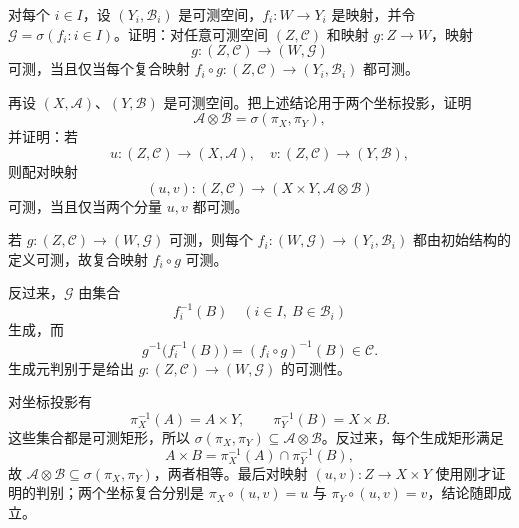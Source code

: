 \begin{exercise}
\label{b1:ex:10}
对每个 \(i\in I\)，设 \((Y_i,\mathcal B_i)\) 是可测空间，\(f_i:W\to Y_i\) 是映射，并令
\(
\mathcal G=\sigma(f_i:i\in I)
\)。证明：对任意可测空间 \((Z,\mathcal C)\) 和映射 \(g:Z\to W\)，映射
\[
g:(Z,\mathcal C)\longrightarrow(W,\mathcal G)
\]
可测，当且仅当每个复合映射 \(f_i\circ g:(Z,\mathcal C)\to(Y_i,\mathcal B_i)\) 都可测。

\ProseParagraphBreak

再设 \((X,\mathcal A)\)、\((Y,\mathcal B)\) 是可测空间。把上述结论用于两个坐标投影，证明
\[
\mathcal A\otimes\mathcal B
=\sigma(\pi_X,\pi_Y),
\]
并证明：若
\[
u:(Z,\mathcal C)\longrightarrow(X,\mathcal A),
\quad
v:(Z,\mathcal C)\longrightarrow(Y,\mathcal B),
\]
则配对映射
\[
(u,v):(Z,\mathcal C)
\longrightarrow(X\times Y,\mathcal A\otimes\mathcal B)
\]
可测，当且仅当两个分量 \(u,v\) 都可测。
\end{exercise}
\begin{solution}
若 \(g:(Z,\mathcal C)\to(W,\mathcal G)\) 可测，则每个 \(f_i:(W,\mathcal G)\to(Y_i,\mathcal B_i)\) 都由初始结构的定义可测，故复合映射 \(f_i\circ g\) 可测。

反过来，\(\mathcal G\) 由集合
\[
f_i^{-1}(B)
\quad(i\in I,\ B\in\mathcal B_i)
\]
生成，而
\[
g^{-1}\bigl(f_i^{-1}(B)\bigr)
=(f_i\circ g)^{-1}(B)
\in\mathcal C.
\]
生成元判别于是给出 \(g:(Z,\mathcal C)\to(W,\mathcal G)\) 的可测性。

对坐标投影有
\[
\pi_X^{-1}(A)=A\times Y,
\qquad
\pi_Y^{-1}(B)=X\times B.
\]
这些集合都是可测矩形，所以 \(\sigma(\pi_X,\pi_Y)\subseteq\mathcal A\otimes\mathcal B\)。反过来，每个生成矩形满足
\[
A\times B
=\pi_X^{-1}(A)\cap\pi_Y^{-1}(B),
\]
故 \(\mathcal A\otimes\mathcal B\subseteq\sigma(\pi_X,\pi_Y)\)，两者相等。最后对映射 \((u,v):Z\to X\times Y\) 使用刚才证明的判别；两个坐标复合分别是
\(
\pi_X\circ(u,v)=u
\)
与
\(
\pi_Y\circ(u,v)=v
\)，结论随即成立。
\end{solution}
